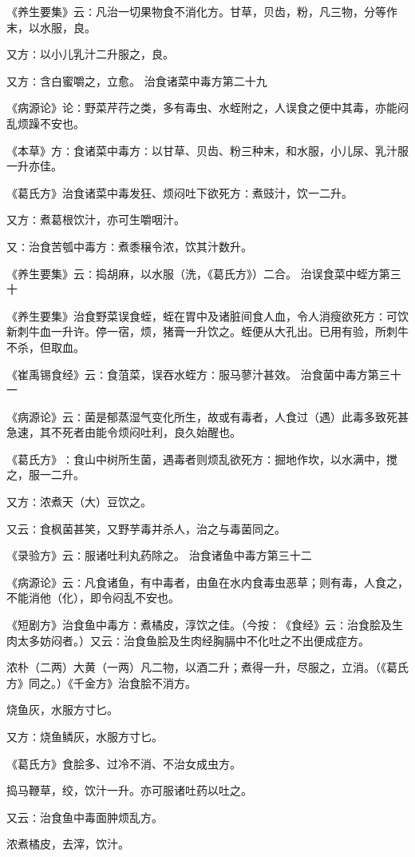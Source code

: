 \documentclass[a4paper,12pt,UTF8,twoside]{ctexbook}
\begin{document}
《养生要集》云∶凡治一切果物食不消化方。甘草，贝齿，粉，凡三物，分等作末，以水服，良。

又方∶以小儿乳汁二升服之，良。

又方∶含白蜜嚼之，立愈。
治食诸菜中毒方第二十九

《病源论》论∶野菜芹荇之类，多有毒虫、水蛭附之，人误食之便中其毒，亦能闷乱烦躁不安也。

《本草》方∶食诸菜中毒方∶以甘草、贝齿、粉三种末，和水服，小儿尿、乳汁服一升亦佳。

《葛氏方》治食诸菜中毒发狂、烦闷吐下欲死方∶煮豉汁，饮一二升。

又方∶煮葛根饮汁，亦可生嚼咽汁。

又∶治食苦瓠中毒方∶煮黍穣令浓，饮其汁数升。

《养生要集》云∶捣胡麻，以水服（洗，《葛氏方》）二合。
治误食菜中蛭方第三十

《养生要集》治食野菜误食蛭，蛭在胃中及诸脏间食人血，令人消瘦欲死方∶可饮新刺牛血一升许。停一宿，烦，猪膏一升饮之。蛭便从大孔出。已用有验，所刺牛不杀，但取血。

《崔禹锡食经》云∶食菹菜，误吞水蛭方∶服马蓼汁甚效。
治食菌中毒方第三十一

《病源论》云∶菌是郁蒸湿气变化所生，故或有毒者，人食过（遇）此毒多致死甚急速，其不死者由能令烦闷吐利，良久始醒也。

《葛氏方》∶食山中树所生菌，遇毒者则烦乱欲死方∶掘地作坎，以水满中，搅之，服一二升。

又方∶浓煮天（大）豆饮之。

又云∶食枫菌甚笑，又野芋毒并杀人，治之与毒菌同之。

《录验方》云∶服诸吐利丸药除之。
治食诸鱼中毒方第三十二

《病源论》云∶凡食诸鱼，有中毒者，由鱼在水内食毒虫恶草；则有毒，人食之，不能消他（化），即令闷乱不安也。

《短剧方》治食鱼中毒方∶煮橘皮，淳饮之佳。（今按∶《食经》云∶治食脍及生肉太多妨闷者。）又云∶治食鱼脍及生肉经胸膈中不化吐之不出便成症方。

浓朴（二两）大黄（一两）凡二物，以酒二升；煮得一升，尽服之，立消。（《葛氏方》同之。）《千金方》治食脍不消方。

烧鱼灰，水服方寸匕。

又方∶烧鱼鳞灰，水服方寸匕。

《葛氏方》食脍多、过冷不消、不治女成虫方。

捣马鞭草，绞，饮汁一升。亦可服诸吐药以吐之。

又云∶治食鱼中毒面肿烦乱方。

浓煮橘皮，去滓，饮汁。
\end{document}
